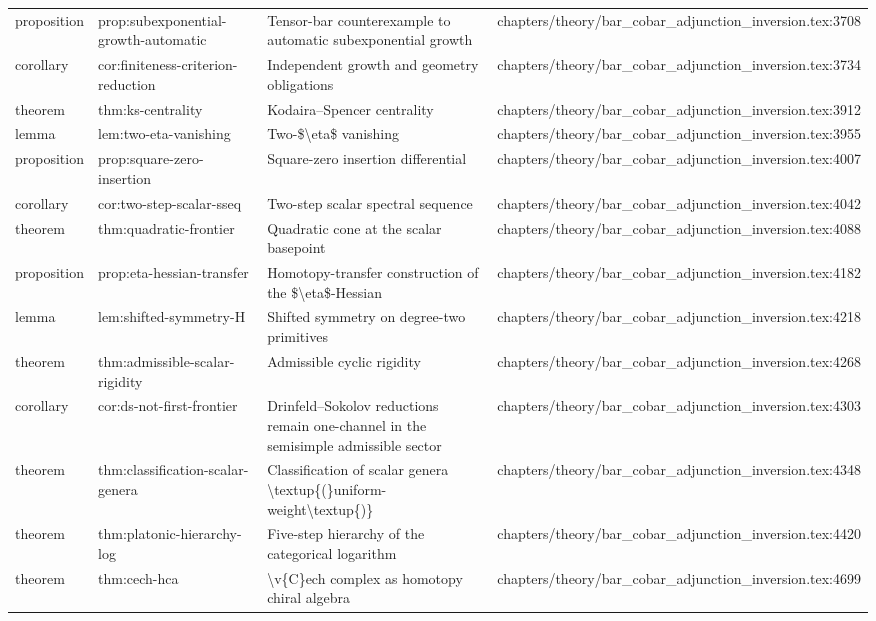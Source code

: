 \documentclass[11pt]{article}
\begin{document}
\begin{longtable}{L{0.10\textwidth}L{0.26\textwidth}L{0.42\textwidth}L{0.22\textwidth}}
proposition & prop:subexponential-growth-automatic & Tensor-bar counterexample to automatic subexponential growth & chapters/theory/bar\_cobar\_adjunction\_inversion.tex:3708\\
corollary & cor:finiteness-criterion-reduction & Independent growth and geometry obligations & chapters/theory/bar\_cobar\_adjunction\_inversion.tex:3734\\
theorem & thm:ks-centrality & Kodaira--Spencer centrality & chapters/theory/bar\_cobar\_adjunction\_inversion.tex:3912\\
lemma & lem:two-eta-vanishing & Two-\$\textbackslash{}eta\$ vanishing & chapters/theory/bar\_cobar\_adjunction\_inversion.tex:3955\\
proposition & prop:square-zero-insertion & Square-zero insertion differential & chapters/theory/bar\_cobar\_adjunction\_inversion.tex:4007\\
corollary & cor:two-step-scalar-sseq & Two-step scalar spectral sequence & chapters/theory/bar\_cobar\_adjunction\_inversion.tex:4042\\
theorem & thm:quadratic-frontier & Quadratic cone at the scalar basepoint & chapters/theory/bar\_cobar\_adjunction\_inversion.tex:4088\\
proposition & prop:eta-hessian-transfer & Homotopy-transfer construction of the \$\textbackslash{}eta\$-Hessian & chapters/theory/bar\_cobar\_adjunction\_inversion.tex:4182\\
lemma & lem:shifted-symmetry-H & Shifted symmetry on degree-two primitives & chapters/theory/bar\_cobar\_adjunction\_inversion.tex:4218\\
theorem & thm:admissible-scalar-rigidity & Admissible cyclic rigidity & chapters/theory/bar\_cobar\_adjunction\_inversion.tex:4268\\
corollary & cor:ds-not-first-frontier & Drinfeld--Sokolov reductions remain one-channel in the semisimple admissible sector & chapters/theory/bar\_cobar\_adjunction\_inversion.tex:4303\\
theorem & thm:classification-scalar-genera & Classification of scalar genera \textbackslash{}textup\{(\}uniform-weight\textbackslash{}textup\{)\} & chapters/theory/bar\_cobar\_adjunction\_inversion.tex:4348\\
theorem & thm:platonic-hierarchy-log & Five-step hierarchy of the categorical logarithm & chapters/theory/bar\_cobar\_adjunction\_inversion.tex:4420\\
theorem & thm:cech-hca & \textbackslash{}v\{C\}ech complex as homotopy chiral algebra & chapters/theory/bar\_cobar\_adjunction\_inversion.tex:4699\\

\end{longtable}
\end{document}
